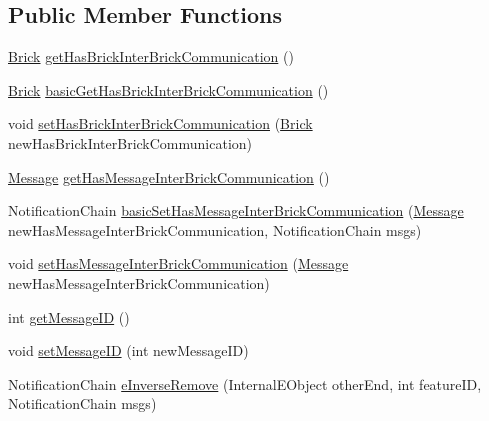 \subsection*{Public Member Functions}
\begin{DoxyCompactItemize}
\item 
\hyperlink{interfaceshootingmachineemfmodel_1_1_brick}{Brick} \hyperlink{classshootingmachineemfmodel_1_1impl_1_1_inter_brick_communication_impl_ad80b7d688bd27d99cefbe9a99f4fd518}{get\-Has\-Brick\-Inter\-Brick\-Communication} ()
\item 
\hyperlink{interfaceshootingmachineemfmodel_1_1_brick}{Brick} \hyperlink{classshootingmachineemfmodel_1_1impl_1_1_inter_brick_communication_impl_a12de529c11e95ac078401a398a116ab5}{basic\-Get\-Has\-Brick\-Inter\-Brick\-Communication} ()
\item 
void \hyperlink{classshootingmachineemfmodel_1_1impl_1_1_inter_brick_communication_impl_a40681e31d40d1e838ecf5632380b1519}{set\-Has\-Brick\-Inter\-Brick\-Communication} (\hyperlink{interfaceshootingmachineemfmodel_1_1_brick}{Brick} new\-Has\-Brick\-Inter\-Brick\-Communication)
\item 
\hyperlink{interfaceshootingmachineemfmodel_1_1_message}{Message} \hyperlink{classshootingmachineemfmodel_1_1impl_1_1_inter_brick_communication_impl_ac39dee92ed6a0c0e6a4c3df0b7a68f26}{get\-Has\-Message\-Inter\-Brick\-Communication} ()
\item 
Notification\-Chain \hyperlink{classshootingmachineemfmodel_1_1impl_1_1_inter_brick_communication_impl_a27a9c22761d788faa5768cc17798d4e1}{basic\-Set\-Has\-Message\-Inter\-Brick\-Communication} (\hyperlink{interfaceshootingmachineemfmodel_1_1_message}{Message} new\-Has\-Message\-Inter\-Brick\-Communication, Notification\-Chain msgs)
\item 
void \hyperlink{classshootingmachineemfmodel_1_1impl_1_1_inter_brick_communication_impl_a64da3e15423c5ef82a29836bbf99c5f2}{set\-Has\-Message\-Inter\-Brick\-Communication} (\hyperlink{interfaceshootingmachineemfmodel_1_1_message}{Message} new\-Has\-Message\-Inter\-Brick\-Communication)
\item 
int \hyperlink{classshootingmachineemfmodel_1_1impl_1_1_inter_brick_communication_impl_ace5e994ef218bf1074d002ebaef563b0}{get\-Message\-I\-D} ()
\item 
void \hyperlink{classshootingmachineemfmodel_1_1impl_1_1_inter_brick_communication_impl_a21dd3927632c4447e9d13d18bc3fe12a}{set\-Message\-I\-D} (int new\-Message\-I\-D)
\item 
Notification\-Chain \hyperlink{classshootingmachineemfmodel_1_1impl_1_1_inter_brick_communication_impl_a437c608842daa32ee44897c72f78f114}{e\-Inverse\-Remove} (Internal\-E\-Object other\-End, int feature\-I\-D, Notification\-Chain msgs)

\end{DoxyCompactItemize}
